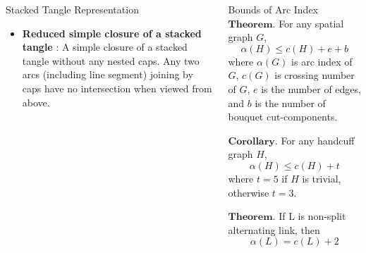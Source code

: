 \documentclass[final]{beamer}
\begin{document}
\begin{frame}[t]
\begin{columns}[t]
\begin{block}{Stacked Tangle Representation}
\begin{itemize}
\begin{figure}
        \caption{Stacked tangle and simple closure of handcuff graph $2_1$}
      \end{figure}
      \item \textbf{Reduced simple closure of a stacked tangle} : A simple closure of a stacked tangle without any nested caps. Any two arcs (including line segment) joining by caps have no intersection when viewed from above.
    \end{itemize}
  \end{block}

  
  \begin{block}{Bounds of Arc Index}
  $\mathbf{Theorem.}$ For any spatial graph $G$,
  \begin{equation*}
    \alpha(H) \leq c(H) + e + b
  \end{equation*}
  where $\alpha (G)$ is arc index of $G$, $c(G)$ is crossing number of $G$, $e$ is the number of edges, and $b$ is the number of bouquet cut-components.
  
  $\mathbf{Corollary.}$ For any handcuff graph $H$,
  \begin{equation*}
    \alpha(H) \leq c(H) + t
  \end{equation*}
  where $t=5$ if $H$ is trivial, otherwise $t=3$.


  $\mathbf{Theorem.}$ If L is non-split alternating link, then 
  \begin{equation*}
    \alpha(L) = c(L)+2
  \end{equation*}



\end{block}
\end{columns}
\end{frame}
\end{document}
